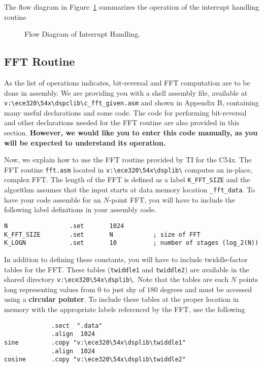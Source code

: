 The flow diagram in Figure~\ref{fig:flow} summarizes the operation 
of the interrupt handling routine 
\begin{figure}[ht]
   \begin{center}
      \caption{Flow Diagram of Interrupt Handling.}
      \label{fig:flow}
   \end{center}
\end{figure}

\subsection{FFT Routine}

As the list of operations indicates, bit-reversal and FFT 
computation are to be done in assembly.  
We are providing you with a shell assembly file, 
available at \verb+v:\ece320\54x\dspclib\c_fft_given.asm+ and 
shown in Appendix B, containing many useful declarations and some code.  
The code for performing 
bit-reversal and other declarations needed for the FFT routine are 
also provided in this section.  {\bf However, we would like you 
to enter this code manually, as you will be expected to 
understand its operation.}  

Now, we explain how to use the FFT routine provided by 
TI for the C54x.
The FFT routine \verb+fft.asm+ located in
\verb+v:\ece320\54x\dsplib\+ computes an in-place, complex FFT.
The length of the FFT is defined as a label  
\verb+K_FFT_SIZE+ and the algorithm assumes that the
input starts at data memory location \verb+_fft_data+.
To have your code assemble for an $N$-point FFT, you will have to
include the following label definitions in your assembly code.
\begin{verbatim}
N                 .set       1024
K_FFT_SIZE        .set       N           ; size of FFT
K_LOGN            .set       10          ; number of stages (log_2(N))
\end{verbatim}
In addition to defining these constants, you will have to
include twiddle-factor tables for the FFT.  These
tables (\verb+twiddle1+ and \verb+twiddle2+) are 
available in the shared directory \verb+v:\ece320\54x\dsplib\+.
Note that the tables are each $N$ points long representing values
from $0$ to just shy of $180$ degrees and must
be accessed using a {\bf circular pointer}. To include these
tables at the proper location in memory with the appropriate
labels referenced by the FFT, use the following
\begin{verbatim}
             .sect  ".data"
             .align  1024
sine         .copy "v:\ece320\54x\dsplib\twiddle1"
             .align  1024
cosine       .copy "v:\ece320\54x\dsplib\twiddle2"
\end{verbatim}

